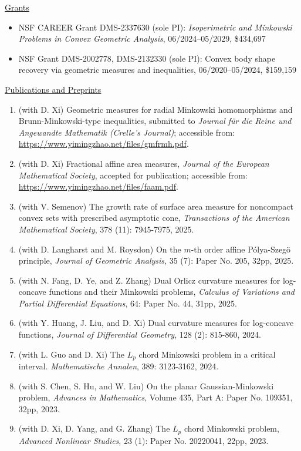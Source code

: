 \documentclass[12pt]{article}
\theoremstyle{plain} \numberwithin{equation}{section}
\theoremstyle{definition}
\newcommand{\cvsection}[1]{%
  \Needspace{6\baselineskip}%
  \par\addvspace{0.8\baselineskip}%
  \noindent\underline{#1}\par\nobreak
  \vspace{0.3\baselineskip}%
}
\begin{document}
\cvsection{Grants}
\begin{itemize}
		\item NSF CAREER Grant DMS-2337630 (sole PI): \emph{Isoperimetric and Minkowski Problems in Convex Geometric Analysis}, 06/2024--05/2029, \$434,697
		\item NSF Grant DMS-2002778, DMS-2132330 (sole PI): Convex body shape recovery via geometric measures and inequalities, 06/2020--05/2024, \$159,159
\end{itemize}

\cvsection{Publications and Preprints}
\begin{enumerate}
\item (with D. Xi) Geometric measures for radial Minkowski homomorphisms and Brunn-Minkowski-type inequalities, submitted to \emph{Journal f\"ur die Reine und Angewandte Mathematik (Crelle's Journal)}; accessible from: \url{https://www.yimingzhao.net/files/gmfrmh.pdf}.
\item (with D. Xi) Fractional affine area measures, \emph{Journal of the European Mathematical Society}, accepted for publication; accessible from: \url{https://www.yimingzhao.net/files/faam.pdf}.
\item (with V. Semenov) The growth rate of surface area measure for noncompact convex sets with prescribed asymptotic cone, \emph{Transactions of the American Mathematical Society}, 378 (11): 7945-7975, 2025.
\item (with D. Langharst and M. Roysdon) On the $m$-th order affine P\'olya-Szeg\"o principle, \emph{Journal of Geometric Analysis}, 35 (7): Paper No. 205, 32pp, 2025.
\item (with N. Fang, D. Ye, and Z. Zhang) Dual Orlicz curvature measures for log-concave functions and their Minkowski problems, \emph{Calculus of Variations and Partial Differential Equations}, 64: Paper No. 44, 31pp, 2025.
\item (with Y. Huang, J. Liu, and D. Xi) Dual curvature measures for log-concave functions, \emph{Journal of Differential Geometry}, 128 (2): 815-860, 2024.
\item (with L. Guo and D. Xi) The $L_p$ chord Minkowski problem in a critical interval. \emph{Mathematische Annalen}, 389: 3123-3162, 2024.
\item (with S. Chen, S. Hu, and W. Liu) On the planar Gaussian-Minkowski problem, \emph{Advances in Mathematics}, Volume 435, Part A: Paper No. 109351, 32pp, 2023.
\item (with D. Xi, D. Yang, and G. Zhang) The $L_p$ chord Minkowski problem, \emph{Advanced Nonlinear Studies}, 23 (1): Paper No. 20220041, 22pp, 2023.

\end{enumerate}
\end{document}

